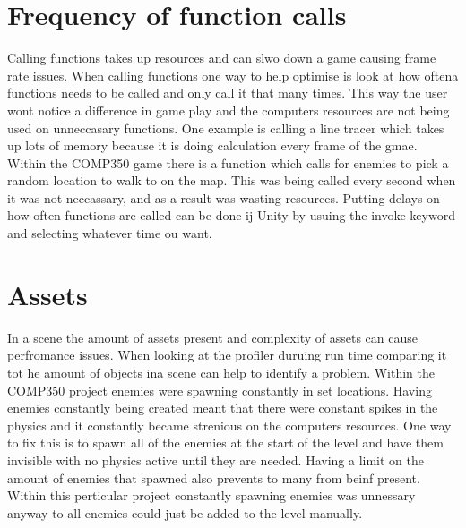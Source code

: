 \documentclass[journal]{IEEEtran}
\begin{document}
\section{Frequency of function calls}
Calling functions takes up resources and can slwo down a game causing frame rate issues.%
When calling functions one way to help optimise is look at how oftena functions needs to be called and only call it that many times.
This way the user wont notice a difference in game play and the computers resources are not being used on unneccasary functions.
One example is calling a line tracer which takes up lots of memory because it is doing calculation every frame of the gmae.
Within the COMP350 game there is a function which calls for enemies to pick a random location to walk to on the map.
This was being called every second when it was not neccassary, and as a result was wasting resources.
Putting delays on how often functions are called can be done ij Unity by usuing the invoke keyword and selecting whatever time ou want.

\section{Assets}
In a scene the amount of assets present and complexity of assets can cause perfromance issues.%
When looking at the profiler duruing run time comparing it tot he amount of objects ina scene can help to identify a problem.
Within the COMP350 project enemies were spawning constantly in set locations.
Having enemies constantly being created meant that there were constant spikes in the physics and it constantly became strenious on the computers resources.
One way to fix this is to spawn all of the enemies at the start of the level and have them invisible with no physics active until they are needed.
Having a limit on the amount of enemies that spawned also prevents to many from beinf present.
Within this perticular project constantly spawning enemies was unnessary anyway to all enemies could just be added to the level manually.
\end{document}
